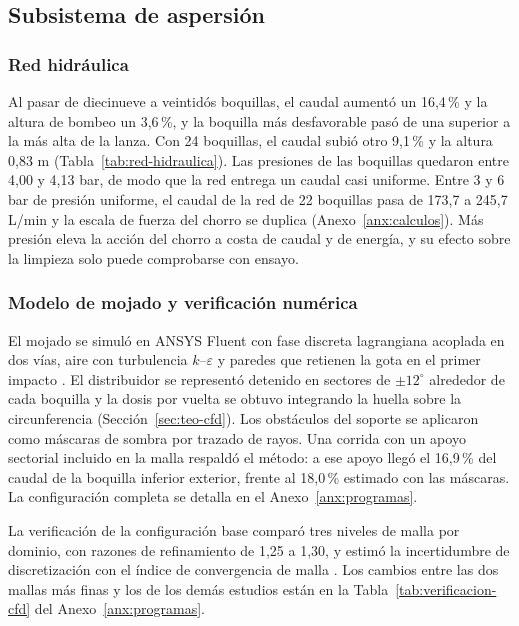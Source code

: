 \subsection{Subsistema de aspersión}
\label{sec:resultados-aspersion}

\subsubsection{Red hidráulica}

Al pasar de diecinueve a veintidós boquillas, el caudal aumentó un 16,4\,\% y la altura de bombeo un 3,6\,\%, y la boquilla más desfavorable pasó de una superior a la más alta de la lanza. Con 24 boquillas, el caudal subió otro 9,1\,\% y la altura 0,83 m (Tabla~\ref{tab:red-hidraulica}). Las presiones de las boquillas quedaron entre 4,00 y 4,13 bar, de modo que la red entrega un caudal casi uniforme. Entre 3 y 6 bar de presión uniforme, el caudal de la red de 22 boquillas pasa de 173,7 a 245,7 L/min y la escala de fuerza del chorro se duplica (Anexo~\ref{anx:calculos}). Más presión eleva la acción del chorro a costa de caudal y de energía, y su efecto sobre la limpieza solo puede comprobarse con ensayo.

\subsubsection{Modelo de mojado y verificación numérica}

El mojado se simuló en ANSYS Fluent con fase discreta lagrangiana acoplada en dos vías, aire con turbulencia $k$--$\varepsilon$ y paredes que retienen la gota en el primer impacto \cite{fluent2026}. El distribuidor se representó detenido en sectores de $\pm12^\circ$ alrededor de cada boquilla y la dosis por vuelta se obtuvo integrando la huella sobre la circunferencia (Sección~\ref{sec:teo-cfd}). Los obstáculos del soporte se aplicaron como máscaras de sombra por trazado de rayos. Una corrida con un apoyo sectorial incluido en la malla respaldó el método: a ese apoyo llegó el 16,9\,\% del caudal de la boquilla inferior exterior, frente al 18,0\,\% estimado con las máscaras. La configuración completa se detalla en el Anexo~\ref{anx:programas}.

La verificación de la configuración base comparó tres niveles de malla por dominio, con razones de refinamiento de 1,25 a 1,30, y estimó la incertidumbre de discretización con el índice de convergencia de malla \cite{celik2008}. Los cambios entre las dos mallas más finas y los de los demás estudios están en la Tabla~\ref{tab:verificacion-cfd} del Anexo~\ref{anx:programas}.

